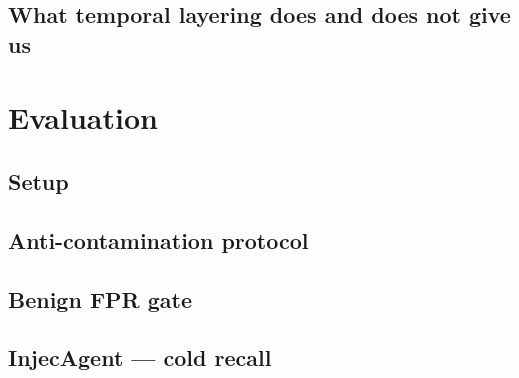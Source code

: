 \documentclass[11pt]{article}
\begin{document}

\subsection{What temporal layering does and does not give us}

\section{Evaluation}
\label{sec:eval}

\subsection{Setup}

\subsection{Anti-contamination protocol}

\subsection{Benign FPR gate}

\subsection{InjecAgent — cold recall}
\end{document}
